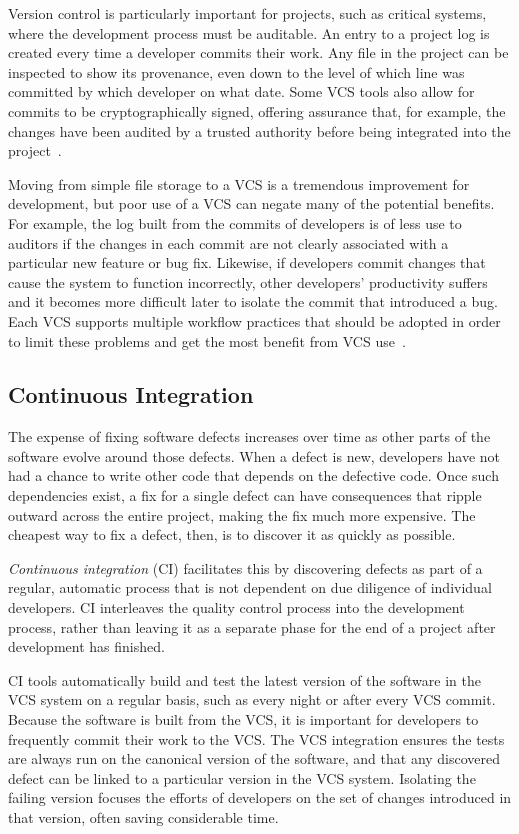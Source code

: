 Version control is particularly important for projects, such as
critical systems, where the development process must be auditable. An
entry to a project log is created every time a developer commits their
work. Any file in the project can be inspected to show its provenance,
even down to the level of which line was committed by which developer
on what date. Some VCS tools also allow for commits to be
cryptographically signed, offering assurance that, for example, the
changes have been audited by a trusted authority before being
integrated into the project~\cite{chacon2014pro}.

Moving from simple file storage to a VCS is a tremendous improvement
for development, but poor use of a VCS can negate many of the
potential benefits. For example, the log built from the commits of
developers is of less use to auditors if the changes in each commit
are not clearly associated with a particular new feature or bug
fix. Likewise, if developers commit changes that cause the system to
function incorrectly, other developers' productivity suffers and it
becomes more difficult later to isolate the commit that introduced a
bug. Each VCS supports multiple workflow practices that should be
adopted in order to limit these problems and get the most benefit from
VCS use~\cite{atlassianworkflow,pilato2008version}.

\subsection{Continuous Integration}

The expense of fixing software defects increases over time as other
parts of the software evolve around those defects. When a defect is
new, developers have not had a chance to write other code that depends
on the defective code. Once such dependencies exist, a fix for a
single defect can have consequences that ripple outward across the
entire project, making the fix much more expensive. The cheapest way
to fix a defect, then, is to discover it as quickly as possible.

\emph{Continuous integration} (CI) facilitates this by discovering
defects as part of a regular, automatic process that is not dependent
on due diligence of individual developers. CI interleaves the quality
control process into the development process, rather than leaving it
as a separate phase for the end of a project after development has
finished.

CI tools automatically build and test the latest version of the
software in the VCS system on a regular basis, such as every night or
after every VCS commit. Because the software is built from the VCS, it
is important for developers to frequently commit their work to the
VCS. The VCS integration ensures the tests are always run on the
canonical version of the software, and that any discovered defect can
be linked to a particular version in the VCS system. Isolating the
failing version focuses the efforts of developers on the set of
changes introduced in that version, often saving considerable time.

